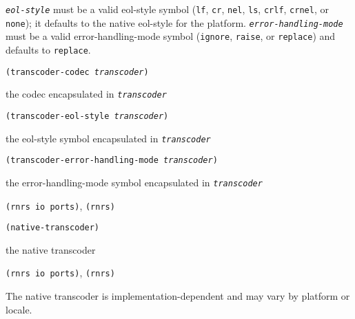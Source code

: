 \texttt{\textit{eol-style}} must be a valid eol-style symbol
(\texttt{lf}, \texttt{cr}, \texttt{nel}, \texttt{ls}, \texttt{crlf},
\texttt{crnel}, or \texttt{none}); it defaults to the native
eol-style for the platform.
\texttt{\textit{error-handling-mode}} must be a valid error-handling-mode
symbol (\texttt{ignore}, \texttt{raise}, or \texttt{replace})
and defaults to \texttt{replace}.

\begin{description}

\label{io_s20}\item[procedure] \texttt{(transcoder-codec \textit{transcoder})}



\item[returns] the codec encapsulated in \texttt{\textit{transcoder}}


\item[procedure] \texttt{(transcoder-eol-style \textit{transcoder})}



\item[returns] the eol-style symbol encapsulated in \texttt{\textit{transcoder}}


\item[procedure] \texttt{(transcoder-error-handling-mode \textit{transcoder})}



\item[returns] the error-handling-mode symbol encapsulated in \texttt{\textit{transcoder}}


\item[libraries] \texttt{(rnrs io ports)}, \texttt{(rnrs)}
\end{description}

\begin{description}

\label{io_s21}\item[procedure] \texttt{(native-transcoder)}



\item[returns] the native transcoder


\item[libraries] \texttt{(rnrs io ports)}, \texttt{(rnrs)}
\end{description}


The native transcoder is implementation-dependent and may vary
by platform or locale.


